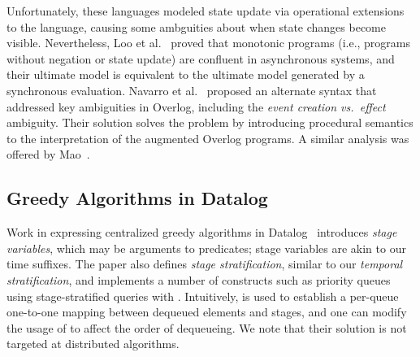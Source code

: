 Unfortunately, these languages modeled state update via operational extensions
to the language, causing some ambguities about when state changes become
visible.  
Nevertheless, Loo et al.~\cite{loo-sigmod06} proved that monotonic programs (i.e., programs
without negation or state update) are confluent in asynchronous systems, and
their ultimate model is equivalent to the ultimate model generated by a
synchronous evaluation.
Navarro et al.~\cite{navarro} proposed an alternate syntax that addressed key ambiguities in Overlog, including the
\emph{event creation vs.\ effect} ambiguity.  Their solution solves the problem by introducing procedural semantics to the interpretation of 
the augmented Overlog programs.  A similar analysis was offered by Mao~\cite{Mao2009}.

\subsection{Greedy Algorithms in Datalog}

Work in expressing centralized greedy algorithms in
Datalog~\cite{greedybychoice} introduces {\em stage variables}, which may be
arguments to predicates; stage variables are akin to our time suffixes.  The
paper also defines {\em stage stratification}, similar to our {\em temporal
stratification}, and implements a number of constructs such as priority queues
using stage-stratified queries with .  Intuitively,
 is used to establish a per-queue one-to-one mapping between
dequeued elements and stages, and one can modify the usage of 
to affect the order of dequeueing.  We note that their solution is not targeted
at distributed algorithms.


